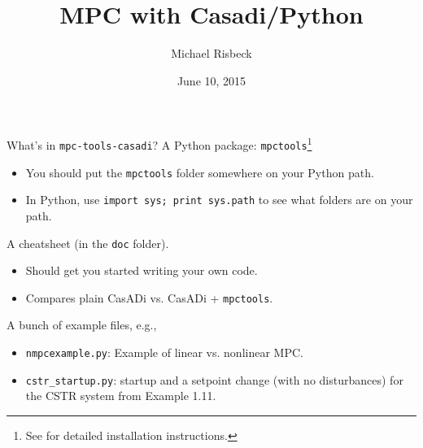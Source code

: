 \documentclass[xcolor=dvipsnames]{beamer}
\title{MPC with Casadi/Python}
\date{June 10, 2015}
\author{Michael Risbeck}
\begin{document}
\frame{\titlepage}

\begin{frame}{What's in \texttt{mpc-tools-casadi}?}
    A Python package: \texttt{mpctools}\footnote{See  for detailed installation instructions.}
    \begin{itemize}
        \item You should put the \texttt{mpctools} folder somewhere on your Python path.
        \item In Python, use \lstinline[style=python]!import sys; print sys.path! to see what folders are on your path.
    \end{itemize}
    
    \medskip
    
    A cheatsheet (in the \texttt{doc} folder).
    \begin{itemize}
        \item Should get you started writing your own code.
        \item Compares plain CasADi vs. CasADi + \texttt{mpctools}.
    \end{itemize}
    
    \medskip
    
    A bunch of example files, e.g.,
    \begin{itemize}
        \item \texttt{nmpcexample.py}: Example of linear vs. nonlinear MPC.
        \item \texttt{cstr\_startup.py}: startup and a setpoint change (with no disturbances) for the CSTR system from Example 1.11.
    \end{itemize}
\end{frame}


%
%
%
%
\end{document}
